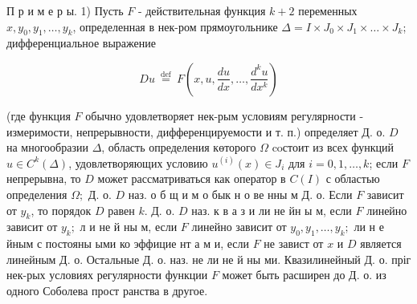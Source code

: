 \documentclass[10pt]{article}
\begin{document}
П р и м е р ы. 1) Пусть $F$ - действительная функция $k+2$ переменных $x, y_{0}, y_{1}, \ldots, y_{k}$, определенная в нек-ром прямоугольнике $\Delta=I \times J_{0} \times J_{1} \times \ldots \times J_{k}$; дифференциальное выражение



\[

D u \stackrel{\text { def }}{=} F\left(x, u, \frac{d u}{d x}, \ldots, \frac{d^{k} u}{d x^{k}}\right)

\]



(где функция $F$ обычно удовлетворяет нек-рым условиям регулярности - измеримости, непрерывности, дифференцируемости и т. п.) определяет Д. о. $D$ на многообразии $\Delta$, область определения көторого $\Omega$ coстоит из всех функций $u \in C^{k}(\Delta)$, удовлетворяющих условию $u^{(i)}(x) \in J_{i}$ для $i=0,1, \ldots, k$; если $F$ непрерывна, то $D$ может рассматриваться как оператор в $C(I)$ с областью определения $\Omega ;$ Д. о. $D$ наз. о б щ и м о бык н о ве нны м Д. о. Если $F$ зависит от $y_{k}$, то порядок $D$ равен $k$. Д. о. $D$ наз. к в а з и ли не йн ы м, если $F$ линейно зависит от $y_{k} ;$ л и не й ны м, если $F$ линейно зависит от $y_{0}, y_{1}, \ldots, y_{k} ;$ ли н е йным с постояны ыми ко эффицие нт а м и, если $F$ не завист от $x$ и $D$ является линейным Д. о. Остальные Д. о. наз. не ли не й ны ми. Квазилинейный Д. о. пріг нек-рых условиях регулярности функции $F$ может быть расширен до Д. о. из одного Соболева прост ранства в другое.
\end{document}
